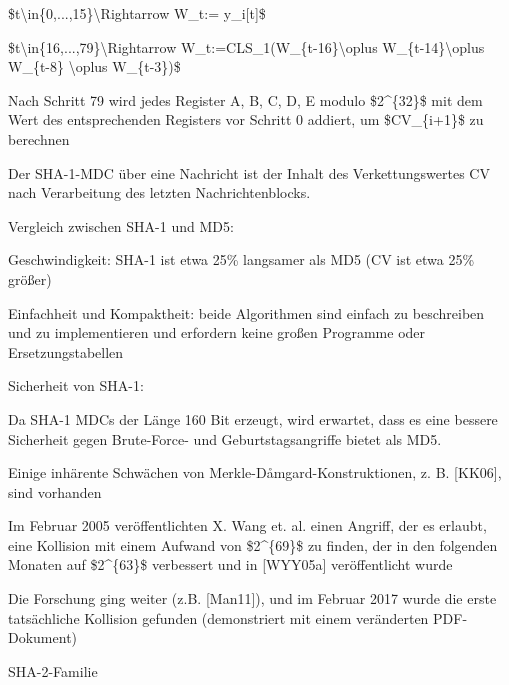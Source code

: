 \documentclass[a4paper]{article}
\begin{document}
\begin{multicols}{3}
\begin{itemize*}
            \begin{itemize*}
                  \item \$t\textbackslash in\{0,...,15\}\textbackslash Rightarrow W\_t:= y\_i{[}t{]}\$
                  \item \$t\textbackslash in\{16,...,79\}\textbackslash Rightarrow W\_t:=CLS\_1(W\_\{t-16\}\textbackslash oplus W\_\{t-14\}\textbackslash oplus W\_\{t-8\} \textbackslash oplus W\_\{t-3\})\$
                  \item Nach Schritt 79 wird jedes Register A, B, C, D, E modulo \$2\^{}\{32\}\$ mit dem Wert des entsprechenden Registers vor Schritt 0 addiert, um \$CV\_\{i+1\}\$ zu berechnen
            \end{itemize*}
            \item
            Der SHA-1-MDC über eine Nachricht ist der Inhalt des Verkettungswertes
            CV nach Verarbeitung des letzten Nachrichtenblocks.
            \item
            Vergleich zwischen SHA-1 und MD5:

            \begin{itemize*}
                  \item Geschwindigkeit: SHA-1 ist etwa 25\% langsamer als MD5 (CV ist etwa 25\% größer)
                  \item Einfachheit und Kompaktheit: beide Algorithmen sind einfach zu beschreiben und zu implementieren und erfordern keine großen Programme oder Ersetzungstabellen
            \end{itemize*}
            \item
            Sicherheit von SHA-1:

            \begin{itemize*}
                  \item Da SHA-1 MDCs der Länge 160 Bit erzeugt, wird erwartet, dass es eine bessere Sicherheit gegen Brute-Force- und Geburtstagsangriffe bietet als MD5.
                  \item Einige inhärente Schwächen von Merkle-Dåmgard-Konstruktionen, z. B. {[}KK06{]}, sind vorhanden
                  \item Im Februar 2005 veröffentlichten X. Wang et. al. einen Angriff, der es erlaubt, eine Kollision mit einem Aufwand von \$2\^{}\{69\}\$ zu finden, der in den folgenden Monaten auf \$2\^{}\{63\}\$ verbessert und in {[}WYY05a{]} veröffentlicht wurde
                  \item Die Forschung ging weiter (z.B. {[}Man11{]}), und im Februar 2017 wurde die erste tatsächliche Kollision gefunden (demonstriert mit einem veränderten PDF-Dokument)
            \end{itemize*}
            \item
            SHA-2-Familie


\end{itemize*}
\end{multicols}
\end{document}
